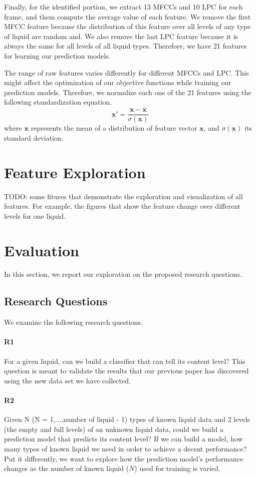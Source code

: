 \documentclass{article} %
\begin{document}
Finally, for the identified portion, we extract 13 MFCCs and 10 LPC for each frame, and them compute the average value of each feature. We remove the first MFCC feature because the distribution of this feature over all levels of any type of liquid are random and. We also remove the last LPC feature because it is always the same for all levels of all liquid types. Therefore, we have 21 features for learning our prediction models.

The range of raw features varies differently for different MFCCs and LPC. This might affect the optimization of our objective functions while training our prediction models. Therefore, we normalize each one of the 21 features using the following standardization equation.
\[\mathbf{x'} = \frac{\mathbf{x}-\overline{\mathbf{x}}}{\sigma(\mathbf{x})}\]
where $\overline{\mathbf{x}}$ represents the mean of a distribution of feature vector $\mathbf{x}$, and $\sigma(\mathbf{x})$ its standard deviation.
\section{Feature Exploration}
TODO: some fitures that demonstrate the exploration and visualization of all features. For example, the figures that show the feature change over different levels for one liquid.


\section{Evaluation}
In this section, we report our exploration on the proposed research questions.

\subsection{Research Questions}
We examine the following research questions.

\paragraph{R1} For a given liquid, can we build a classifier that can tell its content level? This question is meant to validate the results that our previous paper has discovered using the new data set we have collected.

\paragraph{R2} Given N (N = 1,...,number of liquid - 1) types of known liquid data and 2 levels (the empty and full levels) of an unknown liquid data, could we build a prediction model that predicts its content level? If we can build a model, how many types of known liquid we need in order to achieve a decent performance? Put it differently, we want to explore how the prediction model's performance changes as the number of known liquid ($N$) used for training is varied.
\end{document}

